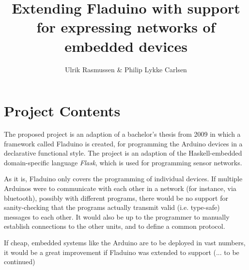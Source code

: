 \documentclass[a4paper, 11pt, oneside, report]{memoir}
\title{Extending Fladuino with support for expressing networks of embedded
devices}
\author{Ulrik Rasmussen \& Philip Lykke Carlsen}
\begin{document}
\maketitle

\section*{Project Contents}

The proposed project is an adaption of a bachelor's thesis from
2009\cite{fladuino} in which a framework called Fladuino is created, for
programming the Arduino devices in a declarative functional style. The project
is an adaption of the Haskell-embedded domain-specific language \emph{Flask},
which is used for programming sensor networks.


As it is, Fladuino only covers the programming of individual devices. If
multiple Arduinos were to communicate with each other in a network (for
instance, via bluetooth), possibly with different programs, there would be no
support for sanity-checking that the programs actually transmit valid (i.e.
type-safe) messages to each other. It would also be up to the programmer to
manually establish connections to the other units, and to define a common
protocol.

If cheap, embedded systems like the Arduino are to be deployed in vast numbers,
it would be a great improvement if Fladuino was extended to support (... to be
continued)



\end{document}
